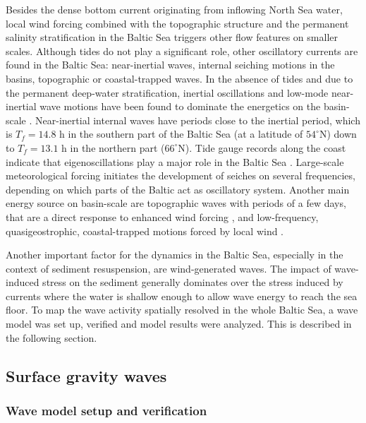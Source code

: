 Besides the dense bottom current originating from inflowing North Sea water, 
local wind forcing combined with the topographic structure and the permanent 
salinity stratification in the Baltic Sea triggers other flow features on 
smaller scales. Although tides do not play a significant role, other 
oscillatory currents are found in the Baltic Sea: near-inertial waves, internal 
seiching motions in the basins, topographic or coastal-trapped waves.
In the absence of tides and due to the permanent deep-water stratification, 
inertial oscillations and low-mode near-inertial wave motions have been found to 
dominate the energetics on the basin-scale \citep[][]{vanderlee2011}. 
Near-inertial internal waves have periods close to the inertial period, which is 
$T_f = 14.8$ h in the southern part of the Baltic Sea (at a latitude of 
$54^{\circ}$N) down to $T_f = 13.1$ h in the northern part ($66^{\circ}$N). 
Tide gauge records along the coast indicate that eigenoscillations play a 
major role in the Baltic Sea \citep[][]{wubber1979}. Large-scale meteorological 
forcing initiates the development of seiches on several frequencies, depending 
on which parts of the Baltic act as oscillatory system. 
 Another main energy source on basin-scale are topographic waves with periods 
of a few days, that are a direct response to enhanced wind forcing 
\citep[][]{holtermann2012}, and low-frequency, quasigeostrophic, 
coastal-trapped motions forced by local wind \citep[][]{pizarro1998}.

Another important factor for the dynamics in the Baltic Sea, especially 
in the context of sediment resuspension, are wind-generated waves. The impact 
of wave-induced stress on the sediment generally dominates over the stress 
induced by currents \citep[][]{Grant1986} where the water is shallow enough to 
allow wave energy to reach the sea floor. To map the wave activity spatially 
resolved in the whole Baltic Sea, a wave model was set up, verified and model 
results were analyzed. This is described in the following section.

\subsection{Surface gravity waves}

\subsubsection{Wave model setup and verification}

